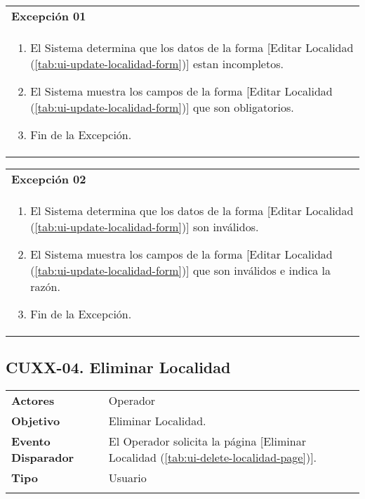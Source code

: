 \begin{tabular}{ p{15.5cm} }
	\textbf{Excepción 01} \\
	\begin{enumerate}
		\item El Sistema determina que los datos de la forma [Editar Localidad (\ref{tab:ui-update-localidad-form})] estan incompletos.
		\item El Sistema muestra los campos de la forma [Editar Localidad (\ref{tab:ui-update-localidad-form})] que son obligatorios.
		\item Fin de la Excepción.
	\end{enumerate}
\end{tabular}

\begin{tabular}{ p{15.5cm} }
	\textbf{Excepción 02} \\
	\begin{enumerate}
		\item El Sistema determina que los datos de la forma [Editar Localidad (\ref{tab:ui-update-localidad-form})] son inválidos.
		\item El Sistema muestra los campos de la forma [Editar Localidad (\ref{tab:ui-update-localidad-form})] que son inválidos e indica la razón.
		\item Fin de la Excepción.
	\end{enumerate}
\end{tabular}


\clearpage
\subsection{CUXX-04. Eliminar Localidad} \label{sec:cu-delete-Localidad}

\begin{tabular}{ p{3.5cm} p{11.5cm} }
	\textbf{Actores} & Operador\\
	\textbf{Objetivo} & Eliminar Localidad.\\
	\textbf{Evento Disparador} & El Operador solicita la página [Eliminar Localidad (\ref{tab:ui-delete-localidad-page})].\\
	\textbf{Tipo} & Usuario\\
	\\
\end{tabular}

